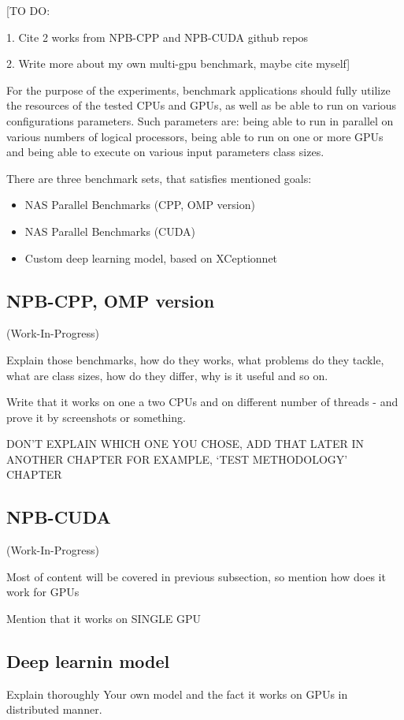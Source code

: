 [TO DO:

1. Cite 2 works from NPB-CPP and NPB-CUDA github repos

2. Write more about my own multi-gpu benchmark, maybe cite myself]

For the purpose of the experiments, benchmark applications should
fully utilize the resources of the tested CPUs and GPUs, as well as
be able to run on various configurations parameters. Such parameters
are: being able to run in parallel on various numbers of logical
processors, being able to run on one or more GPUs and being able to
execute on various input parameters class sizes.

There are three benchmark sets, that satisfies mentioned goals:
\begin{itemize}
    \item NAS Parallel Benchmarks (CPP, OMP version)
    \item NAS Parallel Benchmarks (CUDA)
    \item Custom deep learning model, based on XCeptionnet
\end{itemize}

\subsection{NPB-CPP, OMP version}

(Work-In-Progress)~\cite{NPB-CPP}

Explain those benchmarks, how do they works, what problems do they
tackle, what are class sizes, how do they differ, why is it 
useful and so on.

Write that it works on one a two CPUs and on different number of
threads - and prove it by screenshots or something.

DON'T EXPLAIN WHICH ONE YOU CHOSE, ADD THAT LATER IN ANOTHER CHAPTER
FOR EXAMPLE, `TEST METHODOLOGY' CHAPTER

\subsection{NPB-CUDA}

(Work-In-Progress)~\cite{NPB-CUDA_1}~\cite{NPB-CUDA_2}

Most of content will be covered in previous subsection, so mention
how does it work for GPUs

Mention that it works on SINGLE GPU

\subsection{Deep learnin model}

Explain thoroughly Your own model and the fact it works 
on GPUs in distributed manner.